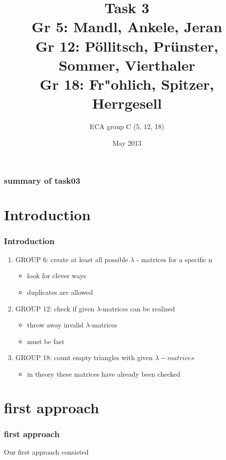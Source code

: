 \documentclass{beamer}
\title{Task 3 \\ \small{Gr 5: Mandl, Ankele, Jeran\\Gr 12: P\"ollitsch, Pr\"unster, Sommer, Vierthaler\\Gr 18: Fr"ohlich, Spitzer, Herrgesell}}
\author{ECA group C (5, 12, 18)}
\date{May 2013}
\begin{document}
\begin{frame}[plain]
	\titlepage
\end{frame}

\begin{frame}
\frametitle{summary of task03}
\end{frame}

\section{Introduction}
\begin{frame}
\frametitle{Introduction}
\begin{enumerate}
\item GROUP 6: create at least all possible $\lambda$ - matrices for a specific n
  \begin{itemize}
  \item look for clever ways
  \item duplicates are allowed
  \end{itemize}
\item GROUP 12: check if given $\lambda$-matrices can be realized
  \begin{itemize}
  \item throw away invalid $\lambda$-matrices
  \item must be fast
  \end{itemize}
\item GROUP 18: count empty triangles with given $\lambda-matrices$
    \begin{itemize}
    \item in theory these matrices have already been checked
    \end{itemize}
\end{enumerate}
\end{frame}



\section{first approach}
\begin{frame}
\frametitle{first approach}
Our first approach consisted 
\end{frame}




\end{document}
